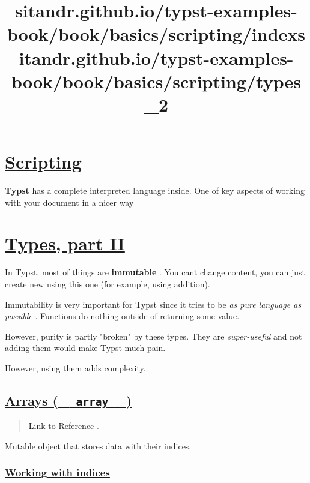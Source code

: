 \title{sitandr.github.io/typst-examples-book/book/basics/scripting/index}

\section{\texorpdfstring{\hyperref[scripting]{Scripting}}{Scripting}}\label{scripting}

\textbf{Typst} has a complete interpreted language inside. One of key
aspects of working with your document in a nicer way


\title{sitandr.github.io/typst-examples-book/book/basics/scripting/types_2}

\section{\texorpdfstring{\hyperref[types-part-ii]{Types, part
II}}{Types, part II}}\label{types-part-ii}

In Typst, most of things are \textbf{immutable} . You
can\textquotesingle t change content, you can just create new using this
one (for example, using addition).

Immutability is very important for Typst since it tries to be \emph{as
pure language as possible} . Functions do nothing outside of returning
some value.

However, purity is partly "broken" by these types. They are
\emph{super-useful} and not adding them would make Typst much pain.

However, using them adds complexity.

\subsection{\texorpdfstring{\hyperref[arrays-array]{Arrays (
\texttt{\ }{\texttt{\ array\ }}\texttt{\ }
)}}{Arrays (   array   )}}\label{arrays-array}

\begin{quote}
\href{https://typst.app/docs/reference/foundations/array/}{Link to
Reference} .
\end{quote}

Mutable object that stores data with their indices.

\subsubsection{\texorpdfstring{\hyperref[working-with-indices]{Working
with indices}}{Working with indices}}\label{working-with-indices}

